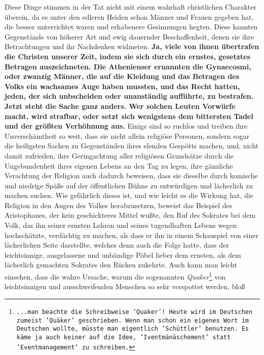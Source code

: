 {Diese Dinge stimmen in der Tat nicht mit einem wahrhaft christlichen Charakter
überein, da es unter den edleren Heiden schon Männer und
Frauen gegeben hat, die
besser unterrichtet waren und erhabenere Gesinnungen hegten. Diese kannten
Gegenstände von höherer Art und ewig dauernder Beschaffenheit, denen sie ihre
Betrachtungen und ihr Nachdenken widmeten. 
\label{ref:17_08_sittenwaechter}
\textbf{Ja, viele von ihnen übertrafen die
Christen unserer Zeit, indem sie sich durch ein ernstes, gesetztes Betragen
auszeichneten. Die Athenienser ernannten die Gynaecosmi, oder zwanzig Männer,
die auf die Kleidung und das Betragen des Volks ein wachsames Auge haben mussten,
und das Recht hatten, jeden, der sich unbscheiden oder unanständig aufführte,
zu bestrafen. Jetzt steht die Sache ganz anders. Wer solchen Leuten
Vorwürfe macht, wird strafbar, oder setzt sich wenigstens dem bittersten Tadel
und der größten Verhöhnung aus.} Einige sind so ruchlos und treiben ihre
Unverschämtheit so weit, dass sie nicht allein religiöse Personen, sondern sogar
die heiligsten Sachen zu Gegenständen ihres elenden Gespötts machen, und, nicht
damit zufrieden, ihre Geringachtung aller religiösen Grundsätze durch die
Ungebundenheit ihres eigenen Lebens an den Tag zu legen, ihre gänzliche
Verachtung der Religion auch dadurch beweisen, dass sie dieselbe durch komische
und niedrige Späße auf der öffentlichen Bühne zu entwürdigen und lächerlich zu
machen suchen. Wie gefährlich dieses ist, und wie leicht es die Wirkung hat, die
Religion in den Augen des Volkes herabzusetzen, beweist das Beispiel des
Aristophanes, der kein geschickteres Mittel wußte,
den Ruf des Sokrates bei dem
Volk, das ihn seiner ernsten Lehren und seines tugendhaften Lebens wegen
hochschätzte, verdächtig zu machen, als dass er ihn in einem Schauspiel von
einer lächerlichen Seite darstellte, welches denn auch die Folge hatte, dass der
leichtsinnige, ausgelassene und unbändige Pöbel lieber
dem ernsten, als dem
lächerlich gemachten Sokrates den Rücken zukehrte. Auch kann man leicht
einsehen, dass die wahre Ursache, warum die sogenannten
\textit{Quaker}\footnote{\texttt{...man beachte die Schreibweise
'Quaker'! Heute wird im Deutschen zumeist 'Quäker' geschrieben. Wenn man schon ein eigenes 
Wort im Deutschen wollte, müsste man eigentlich 'Schüttler' benutzen. Es käme ja auch 
keiner auf die Idee, 'Iventmänäschement' statt 'Eventmanagement' zu schreiben.}} von
leichtsinnigen und ausschweifenden Menschen so sehr verspottet werden, bloß
}
